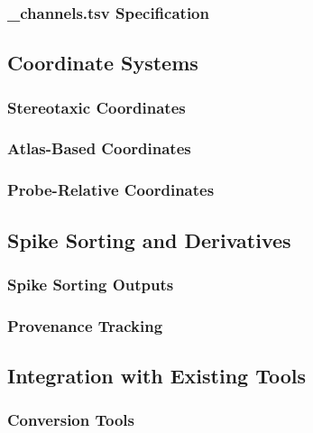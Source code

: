 \documentclass[fleqn,10pt]{wlscirep}
\begin{document}
\subsubsection*{_channels.tsv Specification}

\subsection*{Coordinate Systems}

\subsubsection*{Stereotaxic Coordinates}

\subsubsection*{Atlas-Based Coordinates}

\subsubsection*{Probe-Relative Coordinates}

\subsection*{Spike Sorting and Derivatives}

\subsubsection*{Spike Sorting Outputs}

\subsubsection*{Provenance Tracking}

\subsection*{Integration with Existing Tools}

\subsubsection*{Conversion Tools}
\end{document}
